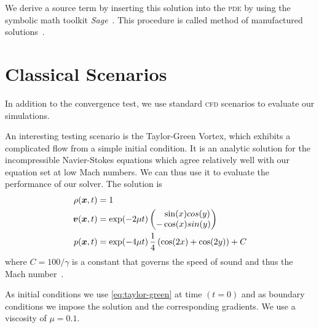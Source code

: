 We derive a source term by inserting this solution into the \textsc{pde} by using the symbolic math toolkit \textit{Sage}~\cite{sagemath}.
This procedure is called method of manufactured solutions~\cite{salari2000code}.

\section{Classical Scenarios}
In addition to the convergence test, we use standard \textsc{cfd} scenarios to evaluate our simulations.


An interesting testing scenario is the Taylor-Green Vortex, which exhibits a complicated flow from a simple initial condition.
It is an analytic solution for the incompressible Navier-Stokes equations which agree relatively well with our equation set at low Mach numbers.
We can thus use it to evaluate the performance of our solver.
The solution is
\begin{align}
  \label{eq:taylor-green}
  \begin{split}
  \rho(\bm{x}, t) &= 1\\
  \bm{v}(\bm{x}, t) &= \exp(-2 \mu t)
  \begin{pmatrix}
    \phantom{-}\sin(x) cos(y) \\
- \cos(x) sin(y) 
    \end{pmatrix} \\
  p(\bm{x}, t) &= \exp(-4 \mu t) \, \frac{1}{4} \left( \cos(2x) + \cos(2y) \right) + C
  \end{split}
\end{align}
where $C = 100/\gamma$ is a constant that governs the speed of sound and thus the Mach number~\cite{dumbser2016high}.

As initial conditions we use \cref{eq:taylor-green} at time $(t = 0)$ and as boundary conditions we impose the solution and the corresponding gradients.
We use a viscosity of $\mu = 0.1$.

